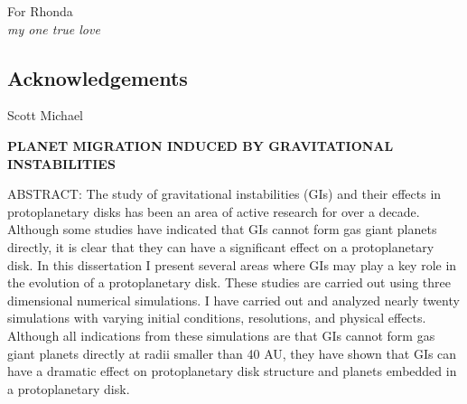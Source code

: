 \clearpage

%
%
%

\vspace*{2.5in}
\begin{center}
For Rhonda \\
{\it my one true love}
\end{center}
\clearpage

%
%

\begin{spacing}{1.66}

%
%
\chapter*{Acknowledgements}





\clearpage

%
%
%

\begin{center}
Scott Michael

\textbf{PLANET MIGRATION INDUCED BY GRAVITATIONAL INSTABILITIES}

\end{center}


\begin{spacing}{1.24}
ABSTRACT: The study of gravitational instabilities (GIs) and their effects in protoplanetary disks has been an area of active research for over a decade. Although some studies have indicated that GIs cannot form gas giant planets directly, it is clear that they can have a significant effect on a protoplanetary disk. In this dissertation I present several areas where GIs may play a key role in the evolution of a protoplanetary disk. These studies are carried out using three dimensional numerical simulations. I have carried out and analyzed nearly twenty simulations with varying initial conditions, resolutions, and physical effects. Although all indications from these simulations are that GIs cannot form gas giant planets directly at radii smaller than 40 AU, they have shown that GIs can have a dramatic effect on protoplanetary disk structure and planets embedded in a protoplanetary disk. 


\end{spacing}
\end{spacing}

